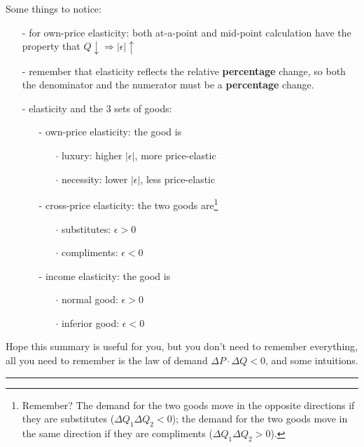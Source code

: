 \documentclass[twoside]{article}
\theoremstyle{definition}
\begin{document}
Some things to notice:
\begin{itemize}
    \item[-] for own-price elasticity: both at-a-point and mid-point calculation have the property that $Q\downarrow \Rightarrow \lvert\epsilon\rvert\uparrow$
    \item[-] remember that elasticity reflects the relative \textbf{percentage} change, so both the denominator and the numerator must be a \textbf{percentage} change.
    \item[-] elasticity and the 3 sets of goods:
    \begin{itemize}
        \item[-] own-price elasticity: the good is
        \begin{itemize}
            \item[$\cdot$] luxury: higher $\lvert\epsilon\rvert$, more price-elastic
            \item[$\cdot$] necessity: lower $\lvert\epsilon\rvert$, less price-elastic
        \end{itemize}
        \item[-] cross-price elasticity: the two goods are\footnote{Remember? The demand for the two goods move in the opposite directions if they are substitutes ($\Delta Q_1\Delta Q_2<0$); the demand for the two goods move in the same direction if they are compliments ($\Delta Q_1\Delta Q_2>0$).}
        \begin{itemize}
            \item[$\cdot$] substitutes:  $\epsilon >0$
            \item[$\cdot$] compliments: $\epsilon <0$
        \end{itemize}
        \item[-] income elasticity: the good is
        \begin{itemize}
            \item[$\cdot$] normal good: $\epsilon>0$
            \item[$\cdot$] inferior good: $\epsilon<0$
        \end{itemize}
    \end{itemize}
\end{itemize}

Hope this summary is useful for you, but you don't need to remember everything, all you need to remember is the law of demand $\Delta P\cdot \Delta Q<0$, and some intuitions.

\vspace{20pt}
\noindent\rule{\textwidth}{0.4pt}
\end{document}
